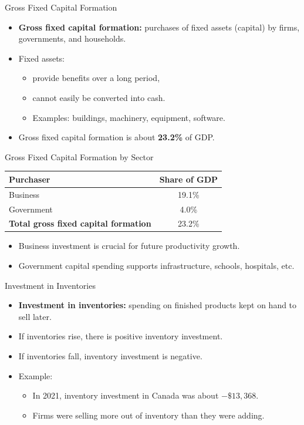 \documentclass[aspectratio=169]{beamer}
\begin{document}
\begin{frame}{Gross Fixed Capital Formation}
\transfade
\begin{itemize}[<+->]
  \item \textbf{Gross fixed capital formation:} purchases of fixed assets (capital) by firms, governments, and households.
  \item Fixed assets:
  \begin{itemize}[<+->]
    \item provide benefits over a long period,
    \item cannot easily be converted into cash.
    \item Examples: buildings, machinery, equipment, software.
  \end{itemize}
  \item Gross fixed capital formation is about \textbf{23.2\%} of GDP.
\end{itemize}
\end{frame}

\begin{frame}{Gross Fixed Capital Formation by Sector}
\transfade
\small
\begin{tabular}{l c}
\toprule
\textbf{Purchaser} & \textbf{Share of GDP} \\
\midrule
Business & 19.1\% \\
Government & 4.0\% \\
\midrule
\textbf{Total gross fixed capital formation} & 23.2\% \\
\bottomrule
\end{tabular}

\vspace{0.7em}
\begin{itemize}[<+->]
  \item Business investment is crucial for \alert{future productivity growth}.
  \item Government capital spending supports infrastructure, schools, hospitals, etc.
\end{itemize}
\end{frame}

\begin{frame}{Investment in Inventories}
\transfade
\begin{itemize}[<+->]
  \item \textbf{Investment in inventories:} spending on finished products kept on hand to sell later.
  \item If inventories rise, there is \alert{positive} inventory investment.
  \item If inventories fall, inventory investment is \alert{negative}.
  \item Example:
  \begin{itemize}[<+->]
    \item In 2021, inventory investment in Canada was about \(-\$13{,}368\).
    \item Firms were selling more out of inventory than they were adding.
  \end{itemize}
\end{itemize}
\end{frame}
\end{document}
